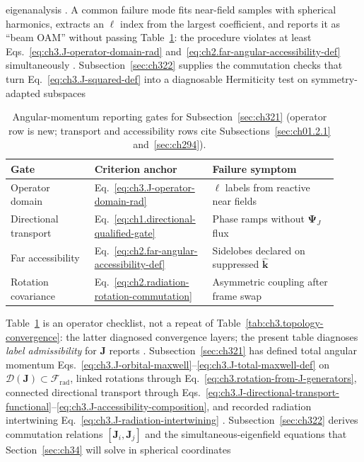 eigenanalysis . A common failure mode fits near-field samples with spherical
harmonics, extracts an \(\ell\) index from the largest coefficient, and reports it as ``beam OAM'' without
passing Table~\ref{tab:ch3.J-reporting-gates}: the procedure violates at least
Eqs.~\eqref{eq:ch3.J-operator-domain-rad} and~\eqref{eq:ch2.far-angular-accessibility-def} simultaneously
. Subsection~\ref{sec:ch322} supplies the commutation checks that
turn Eq.~\eqref{eq:ch3.J-squared-def} into a diagnosable Hermiticity test on symmetry-adapted subspaces
\begin{table}[t]
\centering
\caption{Angular-momentum reporting gates for Subsection~\ref{sec:ch321} (operator row is new; transport and
accessibility rows cite Subsections~\ref{sec:ch01.2.1} and~\ref{sec:ch294}).}
\label{tab:ch3.J-reporting-gates}
\small
\begin{tabular}{@{}p{0.24\linewidth}p{0.32\linewidth}p{0.36\linewidth}@{}}
\toprule
Gate & Criterion anchor & Failure symptom \\
\midrule
Operator domain &
Eq.~\eqref{eq:ch3.J-operator-domain-rad} &
\(\ell\) labels from reactive near fields \\
\addlinespace
Directional transport &
Eq.~\eqref{eq:ch1.directional-qualified-gate} &
Phase ramps without \(\boldsymbol{\Psi}_J\) flux \\
\addlinespace
Far accessibility &
Eq.~\eqref{eq:ch2.far-angular-accessibility-def} &
Sidelobes declared on suppressed \(\widehat{\mathbf{k}}\) \\
\addlinespace
Rotation covariance &
Eq.~\eqref{eq:ch2.radiation-rotation-commutation} &
Asymmetric coupling after frame swap \\
\bottomrule
\end{tabular}
\end{table}
Table~\ref{tab:ch3.J-reporting-gates} is an operator checklist, not a repeat of
Table~\ref{tab:ch3.topology-convergence}: the latter diagnosed convergence layers; the present table diagnoses
\emph{label admissibility} for \(\mathbf{J}\) reports .
Subsection~\ref{sec:ch321} has defined total angular momentum
Eqs.~\eqref{eq:ch3.J-orbital-maxwell}--\eqref{eq:ch3.J-total-maxwell-def} on
\(\mathcal{D}(\mathbf{J})\subset\mathcal{F}_{\mathrm{rad}}\), linked rotations through
Eq.~\eqref{eq:ch3.rotation-from-J-generators}, connected directional transport through
Eqs.~\eqref{eq:ch3.J-directional-transport-functional}--\eqref{eq:ch3.J-accessibility-composition}, and
recorded radiation intertwining Eq.~\eqref{eq:ch3.J-radiation-intertwining} .
Subsection~\ref{sec:ch322} derives commutation relations \([\mathbf{J}_i,\mathbf{J}_j]\) and the
simultaneous-eigenfield equations that Section~\ref{sec:ch34} will solve in spherical coordinates
